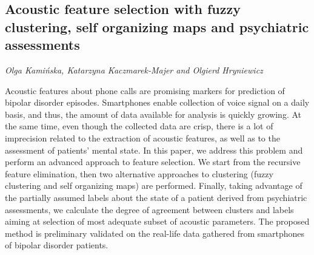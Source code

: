 \documentclass[../booklet.tex]{subfiles}
\begin{document}
\subsection[Acoustic feature selection with fuzzy clustering, self organizing maps and psychiatric assessments. {\it Olga Kamińska, Katarzyna Kaczmarek-Majer and Olgierd Hryniewicz}]{Acoustic feature selection with fuzzy clustering, self organizing maps and psychiatric assessments}
  

\begin{center}
  {\it Olga Kamińska, Katarzyna Kaczmarek-Majer and Olgierd Hryniewicz}
\end{center}





Acoustic features about phone calls are promising markers for prediction of bipolar disorder episodes. Smartphones enable collection of voice signal on a daily basis, and thus, the amount of data available for analysis is quickly growing. At the same time, even though the collected data are crisp, there is a lot of imprecision related to the extraction of acoustic features, as well as to the assessment of patients' mental state. In this paper, we address this problem and perform an advanced approach to feature selection. We start from the recursive feature elimination, then two alternative approaches to clustering (fuzzy clustering and self organizing maps) are performed.
Finally, taking advantage of the partially assumed labels about the state of a patient derived from psychiatric assessments, we calculate the degree of agreement between clusters and labels aiming at selection of most adequate subset of acoustic parameters. The proposed method is preliminary validated on the real-life data gathered from smartphones of bipolar disorder patients.

\end{document}
